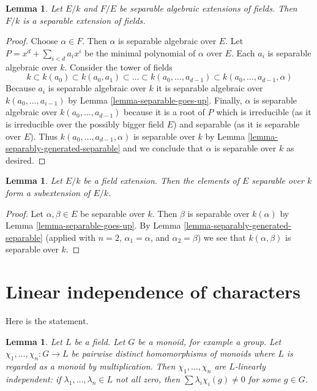 \documentclass{stacks-project}
\theoremstyle{plain}
\newtheorem{lemma}[subsection]{Lemma}
\theoremstyle{definition}
\theoremstyle{remark}
\numberwithin{equation}{subsection}
\begin{document}
\begin{lemma}
\label{lemma-separable-permanence}
Let $E/k$ and $F/E$ be separable algebraic extensions of fields. Then $F/k$
is a separable extension of fields.
\end{lemma}

\begin{proof}
Choose $\alpha \in F$. Then $\alpha$ is separable algebraic over $E$.
Let $P = x^d + \sum_{i < d} a_i x^i$ be the minimal polynomial of
$\alpha$ over $E$. Each $a_i$ is separable algebraic over $k$.
Consider the tower of fields
$$
k \subset k(a_0) \subset k(a_0, a_1) \subset \ldots \subset
k(a_0, \ldots, a_{d - 1}) \subset k(a_0, \ldots, a_{d - 1}, \alpha)
$$
Because $a_i$ is separable algebraic over $k$ it is separable algebraic
over $k(a_0, \ldots, a_{i - 1})$ by Lemma \ref{lemma-separable-goes-up}.
Finally, $\alpha$ is separable algebraic over $k(a_0, \ldots, a_{d - 1})$
because it is a root of $P$ which is irreducible
(as it is irreducible over the possibly bigger field $E$)
and separable (as it is separable over $E$).
Thus $k(a_0, \ldots, a_{d - 1}, \alpha)$ is separable over $k$
by Lemma \ref{lemma-separably-generated-separable}
and we conclude that $\alpha$ is separable over $k$ as desired.
\end{proof}

\begin{lemma}
\label{lemma-separable-elements}
Let $E/k$ be a field extension. Then the elements of $E$ separable
over $k$ form a subextension of $E/k$.
\end{lemma}

\begin{proof}
Let $\alpha, \beta \in E$ be separable over $k$. Then $\beta$ is separable
over $k(\alpha)$ by Lemma \ref{lemma-separable-goes-up}.
By Lemma \ref{lemma-separably-generated-separable} (applied with $n = 2$,
$\alpha_1 = \alpha$, and $\alpha_2 = \beta$) we see that
$k(\alpha, \beta)$ is separable over $k$.
\end{proof}





\section{Linear independence of characters}
\label{section-independence-characters}

\noindent
Here is the statement.

\begin{lemma}
\label{lemma-independence-characters}
Let $L$ be a field. Let $G$ be a monoid, for example a group. Let
$\chi_1, \ldots, \chi_n : G \to L$ be pairwise distinct
homomorphisms of monoids where $L$ is regarded as a monoid
by multiplication. Then $\chi_1, \ldots, \chi_n$
are $L$-linearly independent: if $\lambda_1, \ldots, \lambda_n \in L$
not all zero, then $\sum \lambda_i\chi_i(g) \not = 0$
for some $g \in G$.
\end{lemma}
\end{document}
